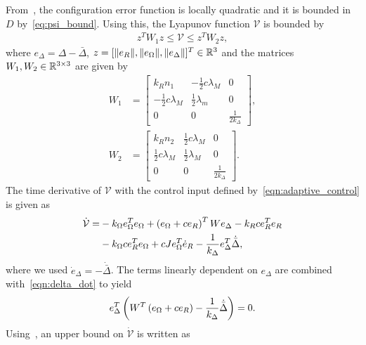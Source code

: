 From~, the configuration error function is locally quadratic and it is bounded in \( D \) by~\cref{eq:psi_bound}.
Using this, the Lyapunov function \( \mathcal{V} \) is bounded by
\begin{align*} %
	z^T W_1 z \leq \mathcal{V} \leq z^T W_2 z ,
\end{align*}
where \( e_\Delta = \Delta - \bar{\Delta} \), \( z = [\|e_R\|,\|e_\Omega\|,\|e_\Delta\|]^T\in\mathbb{R}^3 \) and the matrices \(W_1,W_2 \in \mathbb{R}^{3 \times 3}\) are given by
\begin{align*}
	W_1 & = \begin{bmatrix}
		k_R n_1 & -\frac{1}{2} c \lambda_M & 0 \\
		-\frac{1}{2} c \lambda_M & \frac{1}{2} \lambda_m & 0 \\
		0 & 0 & \frac{1}{2 k_\Delta}
	\end{bmatrix},\\
	W_2 & = \begin{bmatrix}
		k_R n_2 & \frac{1}{2} c \lambda_M & 0 \\
		\frac{1}{2} c \lambda_M & \frac{1}{2} \lambda_M & 0 \\
		0 & 0 & \frac{1}{2 k_\Delta}
	\end{bmatrix} .
\end{align*}
The time derivative of \( \mathcal{V}\) with the control input defined by~\cref{eqn:adaptive_control} is given as
\begin{align*}
	\dot{\mathcal{V}} =& - k_\Omega e_\Omega^T e_\Omega + \left( e_\Omega + c e_R \right)^T W e_\Delta - k_R c e_R^T e_R \nonumber\\
	&- k_\Omega c e_R^T e_\Omega + c J e_\Omega^T \dot{e}_R - \frac{1}{k_\Delta} e_\Delta^T \dot{\bar{\Delta}} , \label{eqn:vdot}
\end{align*}
where we used \( \dot{e}_\Delta = - \dot{\bar{\Delta}} \).
The terms linearly dependent on \( e_\Delta\) are combined with~\cref{eqn:delta_dot} to yield
\begin{align*}
	 e_\Delta^T \left( W^T \left( e_\Omega + c e_R \right) - \frac{1}{k_\Delta} \dot{\bar{\Delta}} \right) = 0 . 
\end{align*}
Using~, an upper bound on \( \dot{\mathcal{V}} \) is written as

